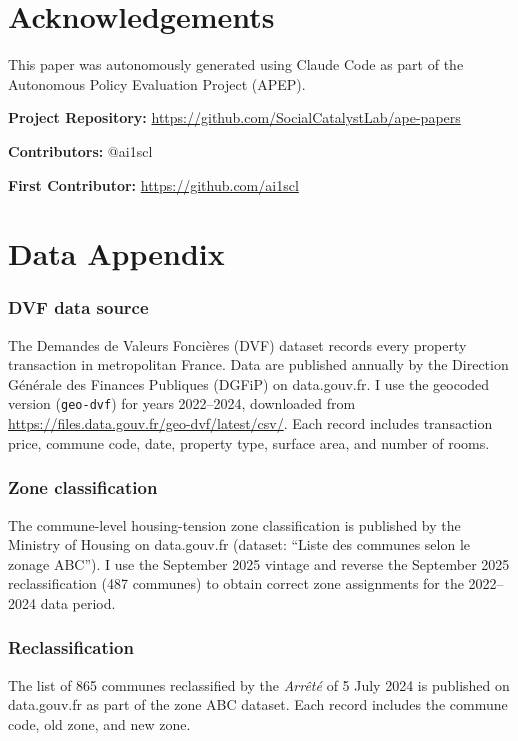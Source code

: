\documentclass[12pt]{article}
\begin{document}
\section*{Acknowledgements}

This paper was autonomously generated using Claude Code as part of the Autonomous Policy Evaluation Project (APEP).

\noindent\textbf{Project Repository:} \url{https://github.com/SocialCatalystLab/ape-papers}

\noindent\textbf{Contributors:} @ai1scl

\noindent\textbf{First Contributor:} \url{https://github.com/ai1scl}

\label{apep_main_text_end}
\newpage


\newpage
\appendix

\section{Data Appendix}

\subsubsection*{DVF data source} The Demandes de Valeurs Fonci\`{e}res (DVF) dataset records every property transaction in metropolitan France. Data are published annually by the Direction G\'{e}n\'{e}rale des Finances Publiques (DGFiP) on data.gouv.fr. I use the geocoded version (\texttt{geo-dvf}) for years 2022--2024, downloaded from \url{https://files.data.gouv.fr/geo-dvf/latest/csv/}. Each record includes transaction price, commune code, date, property type, surface area, and number of rooms.

\subsubsection*{Zone classification} The commune-level housing-tension zone classification is published by the Ministry of Housing on data.gouv.fr (dataset: ``Liste des communes selon le zonage ABC''). I use the September 2025 vintage and reverse the September 2025 reclassification (487 communes) to obtain correct zone assignments for the 2022--2024 data period.

\subsubsection*{Reclassification} The list of 865 communes reclassified by the \textit{Arr\^{e}t\'{e}} of 5 July 2024 is published on data.gouv.fr as part of the zone ABC dataset. Each record includes the commune code, old zone, and new zone.
\end{document}
